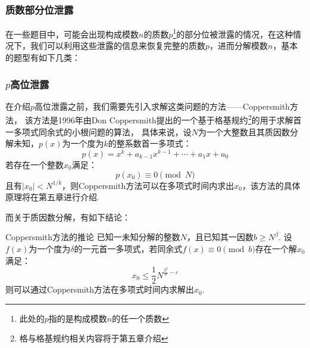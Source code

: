 \documentclass{book}
\numberwithin{equation}{subsubsection}
\begin{document}
\subsubsection{质数部分位泄露}
在一些题目中，可能会出现构成模数$n$的质数$p$\footnote{此处的$p$指的是构成模数$n$的任一个质数}的部分位被泄露的情况，在这种情况下，我们可以利用这些泄露的信息来恢复完整的质数$p$，进而分解模数$n$，基本的题型有如下几类：

\subsubsection*{$p$高位泄露}
在介绍$p$高位泄露之前，我们需要先引入求解这类问题的方法——Coppersmith方法\cite{7,8}，
该方法是1996年由Don Coppersmith提出的一个基于格基规约\footnote{格与格基规约相关内容将于第五章介绍}的用于求解首一多项式同余式的小根问题的算法，
具体来说，设$N$为一个大整数且其质因数分解未知，$p(x)$为一个度为$k$的整系数首一多项式：
\begin{equation}
    p(x)=x^k+a_{k-1}x^{k-1}+\cdots+a_1x+a_0
    \nonumber
\end{equation}
若存在一个整数$x_0$满足：
\begin{equation}
    p(x_0)\equiv 0\pmod{N}
    \nonumber
\end{equation}
且有$|x_0|<N^{1/k}$，则Coppersmith方法可以在多项式时间内求出$x_0$，该方法的具体原理将在第五章进行介绍.\par
而关于质因数分解，有如下结论\cite{9}：

\begin{concept}{Coppersmith方法的推论}
    已知一未知分解的整数$N$，且已知其一因数$b\ge N^{\beta}$.
    设$f(x)$为一个度为$\delta$的一元首一多项式，若同余式$f(x)\equiv0\pmod{b}$存在一个解$x_0$满足：
    \begin{equation}
        x_0\le\frac{1}{2}N^{\frac{\beta^2}{\delta}-\varepsilon}
        \nonumber
    \end{equation}
    则可以通过Coppersmith方法在多项式时间内求解出$x_0$.
\end{concept}
\end{document}
